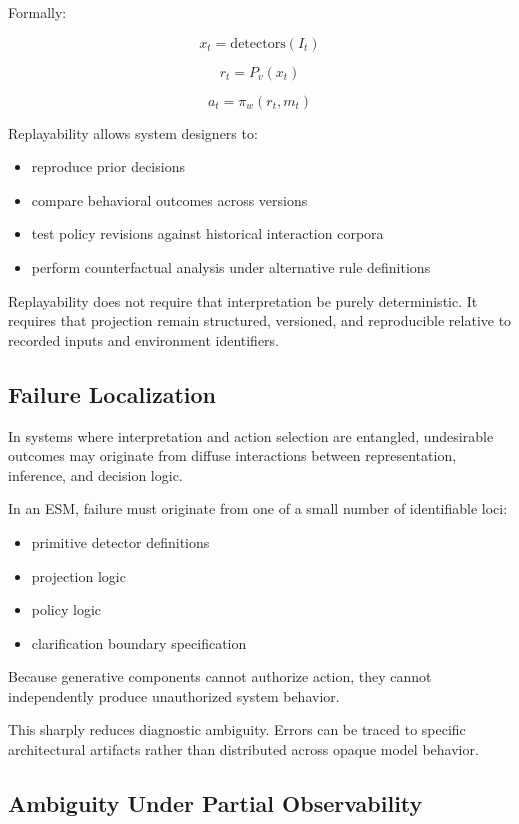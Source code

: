\documentclass[11pt]{article}
\begin{document}
Formally:

\[
x_t = \text{detectors}(I_t)
\]

\[
r_t = P_v(x_t)
\]

\[
a_t = \pi_w(r_t, m_t)
\]

Replayability allows system designers to:

\begin{itemize}
  \item reproduce prior decisions
  \item compare behavioral outcomes across versions
  \item test policy revisions against historical interaction corpora
  \item perform counterfactual analysis under alternative rule definitions
\end{itemize}

Replayability does not require that interpretation be purely deterministic. It requires that projection remain structured, versioned, and reproducible relative to recorded inputs and environment identifiers.

\subsection{Failure Localization}

In systems where interpretation and action selection are entangled, undesirable outcomes may originate from diffuse interactions between representation, inference, and decision logic.

In an ESM, failure must originate from one of a small number of identifiable loci:

\begin{itemize}
  \item primitive detector definitions
  \item projection logic
  \item policy logic
  \item clarification boundary specification
\end{itemize}

Because generative components cannot authorize action, they cannot independently produce unauthorized system behavior.

This sharply reduces diagnostic ambiguity. Errors can be traced to specific architectural artifacts rather than distributed across opaque model behavior.

\subsection{Ambiguity Under Partial Observability}
\end{document}
